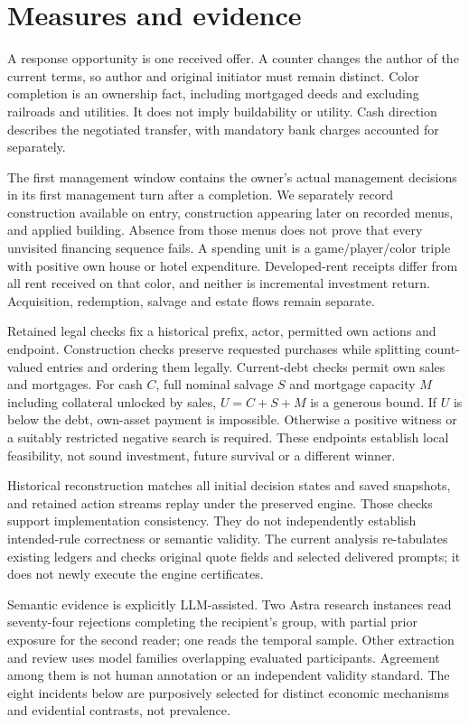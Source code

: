 \section{Measures and evidence}

A response opportunity is one received offer. A counter changes the author of the current terms, so author and original initiator must remain distinct. Color completion is an ownership fact, including mortgaged deeds and excluding railroads and utilities. It does not imply buildability or utility. Cash direction describes the negotiated transfer, with mandatory bank charges accounted for separately.

The first management window contains the owner's actual management decisions in its first management turn after a completion. We separately record construction available on entry, construction appearing later on recorded menus, and applied building. Absence from those menus does not prove that every unvisited financing sequence fails. A spending unit is a game/player/color triple with positive own house or hotel expenditure. Developed-rent receipts differ from all rent received on that color, and neither is incremental investment return. Acquisition, redemption, salvage and estate flows remain separate.

Retained legal checks fix a historical prefix, actor, permitted own actions and endpoint. Construction checks preserve requested purchases while splitting count-valued entries and ordering them legally. Current-debt checks permit own sales and mortgages. For cash $C$, full nominal salvage $S$ and mortgage capacity $M$ including collateral unlocked by sales, $U=C+S+M$ is a generous bound. If $U$ is below the debt, own-asset payment is impossible. Otherwise a positive witness or a suitably restricted negative search is required. These endpoints establish local feasibility, not sound investment, future survival or a different winner.

Historical reconstruction matches all initial decision states and saved snapshots, and retained action streams replay under the preserved engine. Those checks support implementation consistency. They do not independently establish intended-rule correctness or semantic validity. The current analysis re-tabulates existing ledgers and checks original quote fields and selected delivered prompts; it does not newly execute the engine certificates.

Semantic evidence is explicitly LLM-assisted. Two Astra research instances read seventy-four rejections completing the recipient's group, with partial prior exposure for the second reader; one reads the temporal sample. Other extraction and review uses model families overlapping evaluated participants. Agreement among them is not human annotation or an independent validity standard. The eight incidents below are purposively selected for distinct economic mechanisms and evidential contrasts, not prevalence.

